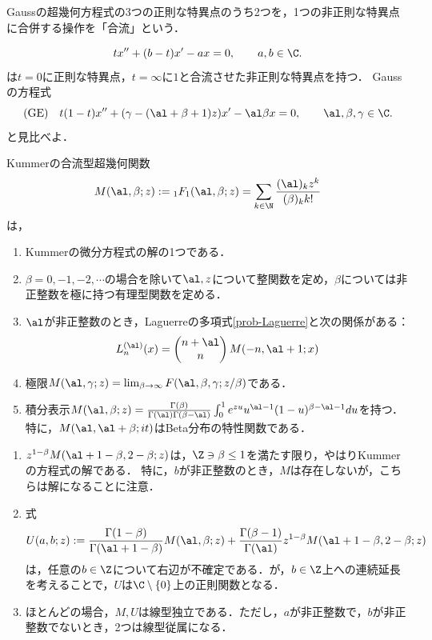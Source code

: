\documentclass[uplatex,dvipdfmx]{jsreport}
\begin{document}
\begin{tcolorbox}[colframe=ForestGreen, colback=ForestGreen!10!white,breakable,colbacktitle=ForestGreen!40!white,coltitle=black,fonttitle=\bfseries\sffamily,
title=]
    Gaussの超幾何方程式の3つの正則な特異点のうち2つを，1つの非正則な特異点に合併する操作を「合流」という．
\end{tcolorbox}

\begin{problem}
    \[tx''+(b-t)x'-ax=0,\qquad a,b\in\C.\]
    は$t=0$に正則な特異点，$t=\infty$に$1$と合流させた非正則な特異点を持つ．
    Gaussの方程式
    \[\text{(GE)}\quad t(1-t)x''+(\gamma-(\al+\beta+1)z)x'-\al\beta x=0,\qquad\al,\beta,\gamma\in\C.\]
    と見比べよ．
\end{problem}

\begin{proposition}
    Kummerの合流型超幾何関数
    \[M(\al,\beta;z):={}_1F_1(\al,\beta;z)=\sum_{k\in\N}\frac{(\al)_kz^k}{(\beta)_kk!}\]
    は，
    \begin{enumerate}
        \item Kummerの微分方程式の解の1つである．
        \item $\beta=0,-1,-2,\cdots$の場合を除いて$\al,z$について整関数を定め，$\beta$については非正整数を極に持つ有理型関数を定める．
        \item $\al$が非正整数のとき，Laguerreの多項式\ref{prob-Laguerre}と次の関係がある：
        \[L^{(\al)}_n(x)=\begin{pmatrix}n+\al\\n\end{pmatrix}M(-n,\al+1;x)\]
        \item 極限$M(\al,\gamma;z)=\lim_{\beta\to\infty}F(\al,\beta,\gamma;z/\beta)$である．
        \item 積分表示$M(\al,\beta;z)=\frac{\Gamma(\beta)}{\Gamma(\al)\Gamma(\beta-\al)}\int^1_0e^{zu}u^{\al-1}(1-u)^{\beta-\al-1}du$を持つ．
        特に，$M(\al,\al+\beta;it)$はBeta分布の特性関数である．
    \end{enumerate}
\end{proposition}

\begin{proposition}
    \begin{enumerate}
        \item $z^{1-\beta}M(\al+1-\beta,2-\beta;z)$は，$\Z\ni\beta\le1$を満たす限り，やはりKummerの方程式の解である．
        特に，$b$が非正整数のとき，$M$は存在しないが，こちらは解になることに注意．
        \item 式
        \[U(a,b;z):=\frac{\Gamma(1-\beta)}{\Gamma(\al+1-\beta)}M(\al,\beta;z)+\frac{\Gamma(\beta-1)}{\Gamma(\al)}z^{1-\beta}M(\al+1-\beta,2-\beta;z)\]
        は，任意の$b\in\Z$について右辺が不確定である．が，$b\in\Z$上への連続延長を考えることで，$U$は$\C\setminus\{0\}$上の正則関数となる．
        \item ほとんどの場合，$M,U$は線型独立である．ただし，$a$が非正整数で，$b$が非正整数でないとき，2つは線型従属になる．
    \end{enumerate}
\end{proposition}
\end{document}
